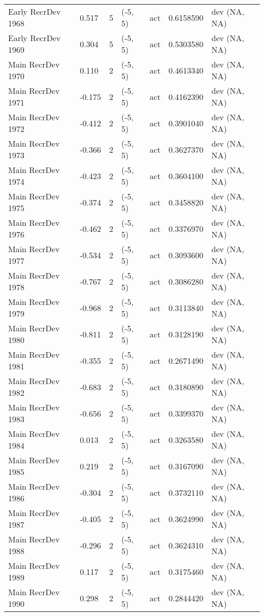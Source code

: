 \documentclass[11pt,
  english,
  letterpaper,
]{article}
\begin{document}
\begin{landscape}
\begin{longtable}[t]{>{\raggedright\arraybackslash}p{7cm}lllll>{\raggedright\arraybackslash}p{4cm}}
Early RecrDev 1968 & 0.517 & 5 & (-5, 5) & act & 0.6158590 & dev (NA, NA)\\
Early RecrDev 1969 & 0.304 & 5 & (-5, 5) & act & 0.5303580 & dev (NA, NA)\\
Main RecrDev 1970 & 0.110 & 2 & (-5, 5) & act & 0.4613340 & dev (NA, NA)\\
Main RecrDev 1971 & -0.175 & 2 & (-5, 5) & act & 0.4162390 & dev (NA, NA)\\
Main RecrDev 1972 & -0.412 & 2 & (-5, 5) & act & 0.3901040 & dev (NA, NA)\\
Main RecrDev 1973 & -0.366 & 2 & (-5, 5) & act & 0.3627370 & dev (NA, NA)\\
Main RecrDev 1974 & -0.423 & 2 & (-5, 5) & act & 0.3604100 & dev (NA, NA)\\
Main RecrDev 1975 & -0.374 & 2 & (-5, 5) & act & 0.3458820 & dev (NA, NA)\\
Main RecrDev 1976 & -0.462 & 2 & (-5, 5) & act & 0.3376970 & dev (NA, NA)\\
Main RecrDev 1977 & -0.534 & 2 & (-5, 5) & act & 0.3093600 & dev (NA, NA)\\
Main RecrDev 1978 & -0.767 & 2 & (-5, 5) & act & 0.3086280 & dev (NA, NA)\\
Main RecrDev 1979 & -0.968 & 2 & (-5, 5) & act & 0.3113840 & dev (NA, NA)\\
Main RecrDev 1980 & -0.811 & 2 & (-5, 5) & act & 0.3128190 & dev (NA, NA)\\
Main RecrDev 1981 & -0.355 & 2 & (-5, 5) & act & 0.2671490 & dev (NA, NA)\\
Main RecrDev 1982 & -0.683 & 2 & (-5, 5) & act & 0.3180890 & dev (NA, NA)\\
Main RecrDev 1983 & -0.656 & 2 & (-5, 5) & act & 0.3399370 & dev (NA, NA)\\
Main RecrDev 1984 & 0.013 & 2 & (-5, 5) & act & 0.3263580 & dev (NA, NA)\\
Main RecrDev 1985 & 0.219 & 2 & (-5, 5) & act & 0.3167090 & dev (NA, NA)\\
Main RecrDev 1986 & -0.304 & 2 & (-5, 5) & act & 0.3732110 & dev (NA, NA)\\
Main RecrDev 1987 & -0.405 & 2 & (-5, 5) & act & 0.3624990 & dev (NA, NA)\\
Main RecrDev 1988 & -0.296 & 2 & (-5, 5) & act & 0.3624310 & dev (NA, NA)\\
Main RecrDev 1989 & 0.117 & 2 & (-5, 5) & act & 0.3175460 & dev (NA, NA)\\
Main RecrDev 1990 & 0.298 & 2 & (-5, 5) & act & 0.2844420 & dev (NA, NA)\\

\end{longtable}
\end{landscape}
\end{document}
